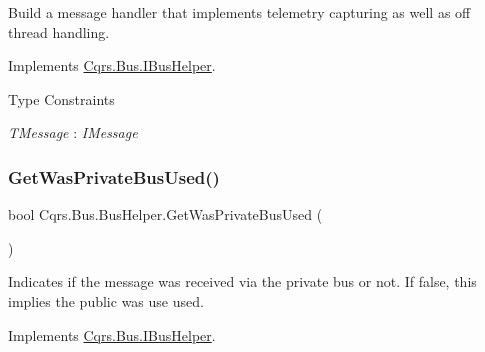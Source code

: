 Build a message handler that implements telemetry capturing as well as off thread handling. 



Implements \hyperlink{interfaceCqrs_1_1Bus_1_1IBusHelper_a29751c186da5e2b042067af6a1be6d5d_a29751c186da5e2b042067af6a1be6d5d}{Cqrs.\+Bus.\+I\+Bus\+Helper}.

\begin{Desc}
\item[Type Constraints]\begin{description}
\item[{\em T\+Message} : {\em I\+Message}]\end{description}
\end{Desc}
\mbox{\label{classCqrs_1_1Bus_1_1BusHelper_a68714a43256976db7d780b126ca3f8bd_a68714a43256976db7d780b126ca3f8bd}} 
\subsubsection{\texorpdfstring{Get\+Was\+Private\+Bus\+Used()}{GetWasPrivateBusUsed()}}
{\footnotesize\ttfamily bool Cqrs.\+Bus.\+Bus\+Helper.\+Get\+Was\+Private\+Bus\+Used (\begin{DoxyParamCaption}{ }\end{DoxyParamCaption})}



Indicates if the message was received via the private bus or not. If false, this implies the public was use used. 



Implements \hyperlink{interfaceCqrs_1_1Bus_1_1IBusHelper_a6e3d49a9367f3709d216f02be0277eea_a6e3d49a9367f3709d216f02be0277eea}{Cqrs.\+Bus.\+I\+Bus\+Helper}.

\mbox{\label{classCqrs_1_1Bus_1_1BusHelper_a381e4fe33069cf8df5349c9cd376f337_a381e4fe33069cf8df5349c9cd376f337}} 

